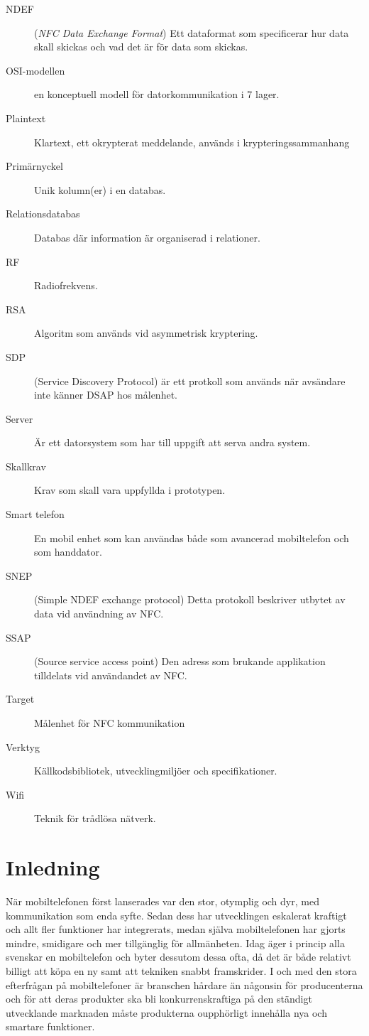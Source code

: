 \documentclass[11pt]{article}
\begin{document}
\begin{description}
\item[NDEF] (\textit{NFC Data Exchange Format}) Ett dataformat som specificerar hur data skall skickas och vad det är för data som skickas.
\item[OSI-modellen] en konceptuell modell för datorkommunikation i 7 lager.
\item[Plaintext] Klartext, ett okrypterat meddelande, används i krypteringssammanhang
\item[Primärnyckel] Unik kolumn(er) i en databas.
\item[Relationsdatabas] Databas där information är organiserad i relationer.
\item[RF] Radiofrekvens.
\item[RSA] Algoritm som används vid asymmetrisk kryptering.
\item[SDP] (Service Discovery Protocol)  är ett protkoll som används när avsändare inte känner DSAP hos målenhet.
\item[Server] Är ett datorsystem som har till uppgift att serva andra system.
\item[Skallkrav] Krav som skall vara uppfyllda i prototypen.
\item[Smart telefon] En mobil enhet som kan användas både som avancerad mobiltelefon och som handdator.
\item[SNEP] (Simple NDEF exchange protocol) Detta protokoll beskriver utbytet av data vid användning av NFC.
\item[SSAP] (Source service access point)  Den adress som brukande applikation tilldelats vid användandet av NFC.
\item[Target] Målenhet för NFC kommunikation
\item[Verktyg] Källkodsbibliotek, utvecklingmiljöer och specifikationer.
\item[Wifi] Teknik för trådlösa nätverk.
\end{description}
\newpage


\setcounter{secnumdepth}{4}
\setcounter{tocdepth}{4}
\tableofcontents
\newpage


\section{Inledning}
När mobiltelefonen först lanserades var den stor, otymplig och dyr, med kommunikation som enda syfte. Sedan dess har utvecklingen eskalerat kraftigt och allt fler funktioner har integrerats, medan själva mobiltelefonen har gjorts mindre, smidigare och mer tillgänglig för allmänheten. Idag äger i princip alla svenskar en mobiltelefon och byter dessutom dessa ofta, då det är både relativt billigt att köpa en ny samt att tekniken snabbt framskrider. I och med den stora efterfrågan på mobiltelefoner är branschen hårdare än någonsin för producenterna och för att deras produkter ska bli konkurrenskraftiga på den ständigt utvecklande marknaden måste produkterna oupphörligt innehålla nya och smartare funktioner.
\end{document}
